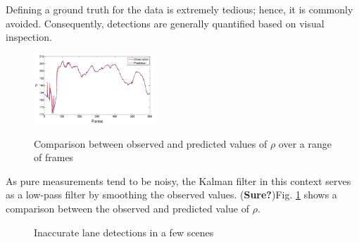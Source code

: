 \documentclass{article}
\begin{document}
Defining a ground truth for the data is extremely tedious; hence, it is commonly avoided. Consequently, detections are generally quantified based on visual inspection. 
\begin{figure}[htb!]
  \centering
  \includegraphics[width=0.4\textwidth]{IMG/obs_pred_rho_crop.png}\\
  \caption{Comparison between observed and predicted values of $\rho$ over a range of frames}
  \label{fig:obs_pred_kalman}
\end{figure}
As pure measurements tend to be noisy, the Kalman filter in this context serves as a low-pass filter by smoothing the observed values. ({\bf Sure?})Fig. \ref{fig:obs_pred_kalman} shows a comparison between the observed and predicted value of $\rho$.
\begin{figure}[htb!]
  \centering
  \hspace{0.00001in}
  \caption{Inaccurate lane detections in a few scenes}
  \label{fig:lane_detection_wrong}
\end{figure}
\end{document}
